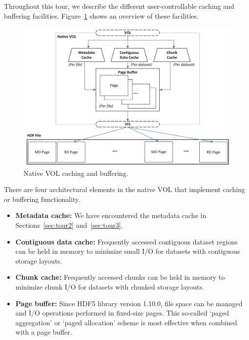 


Throughout this tour, we describe the different user-controllable caching and buffering facilities. Figure~\ref{fig:cache-buf} shows an overview of these facilities.

\begin{figure}[bh]
\centering
\includegraphics[width=\textwidth]{images/Caches to caches.png}
\caption{Native VOL caching and buffering.}
\label{fig:cache-buf}
\end{figure}

There are four architectural elements in the native VOL that implement caching or buffering functionality.

\begin{itemize}
    \item \textbf{Metadata cache:} We have encountered the metadata cache in Sections~\ref{sec:tour2} and~\ref{sec:tour3}.
    \item \textbf{Contiguous data cache:}  Frequently accessed contiguous dataset regions can be held in memory to minimize small I/O for datasets with contiguous storage layouts.
    \item \textbf{Chunk cache:} Frequently accessed chunks can be held in memory to minimize chunk I/O for datasets with chunked storage layouts.
    \item \textbf{Page buffer:} Since HDF5 library version 1.10.0, file space can be managed and I/O operations performed in fixed-size pages. This so-called `paged aggregation' or `paged allocation' scheme is most effective when combined with a page buffer.
\end{itemize}

